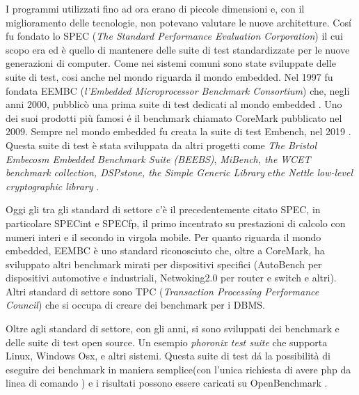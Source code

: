 \documentclass[12pt, a4paper]{report}
\begin{document}
 I programmi utilizzati fino ad ora erano di piccole dimensioni e, con il miglioramento delle tecnologie, non potevano valutare le nuove architetture. Cos\'i fu fondato lo SPEC (\textit{The Standard Performance Evaluation Corporation}) il cui scopo era ed è quello di mantenere delle suite di test standardizzate per le nuove generazioni di computer. 
 Come nei sistemi comuni sono state sviluppate delle suite di test, cosi anche nel mondo riguarda il mondo embedded. Nel 1997 fu fondata EEMBC (\textit{l'Embedded Microprocessor Benchmark Consortium}) che, negli anni 2000, pubblicò una prima suite di test dedicati al mondo embedded \cite{EEMBCSite}. %
 Uno dei suoi prodotti più famosi \'e il benchmark chiamato CoreMark pubblicato nel 2009. %
 Sempre nel mondo embedded fu creata la suite di test Embench, nel 2019 \cite{embenchSite}. Questa suite di test è stata sviluppata da altri progetti come \textit{The Bristol Embecosm Embedded Benchmark Suite (BEEBS)}, \textit{MiBench, the WCET benchmark collection, DSPstone, the Simple Generic Library} e\textit{the Nettle low-level cryptographic library}\cite{NettleSite}\cite{vittekBorovanskyMoreauTurin2006, }\cite{DSPStoneSite} \cite{WCETSite} \cite{MiBenchSite}. %
 
 Oggi gli tra gli standard di settore c'è il precedentemente citato SPEC, in particolare SPECint e SPECfp, il primo incentrato su prestazioni di calcolo con numeri interi e il secondo in virgola mobile. 
 Per quanto riguarda il mondo embedded, EEMBC è uno standard riconosciuto che, oltre a CoreMark, ha sviluppato altri benchmark mirati per dispositivi specifici (AutoBench per dispositivi automotive e industriali, Netwoking2.0 per router e switch e altri). %
 Altri standard di settore sono TPC (\textit{Transaction Processing Performance Council}) che si occupa di creare dei benchmark per i DBMS\cite{TPCSite}. %

 Oltre agli standard di settore, con gli anni, si sono sviluppati dei benchmark e delle suite di test open source. Un esempio \textit{phoronix test suite} \cite{ PhoronixTestSuiteSite}
 che supporta Linux, Windows Osx, e altri sistemi. Questa suite di test d\'a la possibilità di eseguire dei benchmark in maniera semplice(con l'unica richiesta di avere php da linea di comando ) e i risultati possono essere caricati su OpenBenchmark \cite{OpenBenchmarkSite}.
\end{document}

